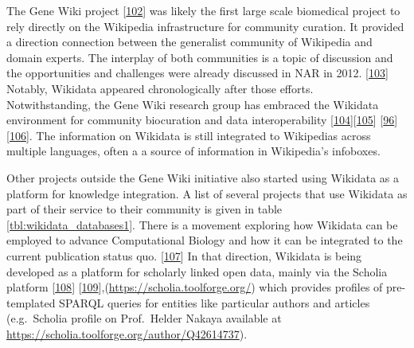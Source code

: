 The Gene Wiki project {[}\protect\hyperlink{ref-18UXATsxP}{102}{]} was likely the first large scale biomedical project to rely directly on the Wikipedia infrastructure for community curation.
It provided a direction connection between the generalist community of Wikipedia and domain experts.
The interplay of both communities is a topic of discussion and the opportunities and challenges were already discussed in NAR in 2012. {[}\protect\hyperlink{ref-13LWXQF0E}{103}{]}\\
Notably, Wikidata appeared chronologically after those efforts.\\
Notwithstanding, the Gene Wiki research group has embraced the Wikidata environment for community biocuration and data interoperability {[}\protect\hyperlink{ref-2ZhxC0dg}{104}{]}{[}\protect\hyperlink{ref-DaJdrXLk}{105}{]} {[}\protect\hyperlink{ref-3GqlN9Dk}{96}{]} {[}\protect\hyperlink{ref-aQfGxPRH}{106}{]}.
The information on Wikidata is still integrated to Wikipedias across multiple languages, often a a source of information in Wikipedia's infoboxes.

Other projects outside the Gene Wiki initiative also started using Wikidata as a platform for knowledge integration.
A list of several projects that use Wikidata as part of their service to their community is given in table \ref{tbl:wikidata_databases1}.
There is a movement exploring how Wikidata can be employed to advance Computational Biology and how it can be integrated to the current publication status quo. {[}\protect\hyperlink{ref-1GijvCQtv}{107}{]}
In that direction, Wikidata is being developed as a platform for scholarly linked open data, mainly via the Scholia platform {[}\protect\hyperlink{ref-hxzL9pmm}{108}{]} {[}\protect\hyperlink{ref-PdG2G4Bp}{109}{]},(\url{https://scholia.toolforge.org/}) which provides profiles of pre-templated SPARQL queries for entities like particular authors and articles (e.g.~Scholia profile on Prof.~Helder Nakaya available at \url{https://scholia.toolforge.org/author/Q42614737}).


